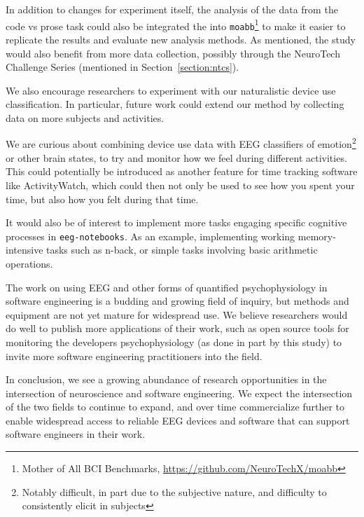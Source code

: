 In addition to changes for experiment itself, the analysis of the data from the code vs prose task could also be integrated the into \texttt{moabb}\footnote{Mother of All BCI Benchmarks, \url{https://github.com/NeuroTechX/moabb}} to make it easier to replicate the results and evaluate new analysis methods. As mentioned, the study would also benefit from more data collection, possibly through the NeuroTech Challenge Series (mentioned in Section~\ref{section:ntcs}).

We also encourage researchers to experiment with our naturalistic device use classification. In particular, future work could extend our method by collecting data on more subjects and activities.

We are curious about combining device use data with EEG classifiers of emotion\footnote{Notably difficult, in part due to the subjective nature, and difficulty to consistently elicit in subjects} or other brain states, to try and monitor how we feel during different activities. This could potentially be introduced as another feature for time tracking software like ActivityWatch, which could then not only be used to see how you spent your time, but also how you felt during that time.

It would also be of interest to implement more tasks engaging specific cognitive processes in \texttt{eeg-notebooks}. As an example, implementing working memory-intensive tasks such as n-back, or simple tasks involving basic arithmetic operations.

The work on using EEG and other forms of quantified psychophysiology in software engineering is a budding and growing field of inquiry, but methods and equipment are not yet mature for widespread use. We believe researchers would do well to publish more applications of their work, such as open source tools for monitoring the developers psychophysiology (as done in part by this study) to invite more software engineering practitioners into the field.


In conclusion, we see a growing abundance of research opportunities in the intersection of neuroscience and software engineering. We expect the intersection of the two fields to continue to expand, and over time commercialize further to enable widespread access to reliable EEG devices and software that can support software engineers in their work.
